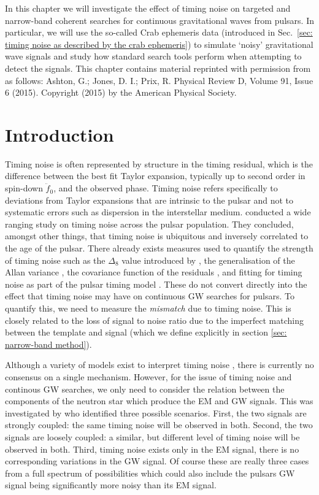 \documentclass[../full_thesis/full_thesis.tex]{subfiles}
\begin{document}
In this chapter we will investigate the effect of timing noise on targeted and
narrow-band coherent searches for continuous gravitational waves from pulsars.
In particular, we will use the so-called Crab ephemeris data (introduced in
Sec.~\ref{sec: timing noise as described by the crab ephemeris}) to simulate
`noisy' gravitational wave signals and study how standard search tools perform
when attempting to detect the signals. This chapter contains material reprinted
with permission from \citet{Ashton2015} as follows: Ashton, G.; Jones, D. I.;
Prix, R. Physical Review D, Volume 91, Issue 6 (2015).  Copyright (2015) by the
American Physical Society.

\section{Introduction}
\label{sec: narrow-band introduction}

Timing noise is
often represented by structure in the timing residual, which is the difference
between the best fit Taylor expansion, typically up to second order in spin-down
$\ddot{f}_0$, and the observed phase. Timing noise refers specifically to
deviations from Taylor expansions that are intrinsic to the pulsar and not to
systematic errors such as dispersion in the interstellar medium.
\citet{Hobbs2010} conducted a wide ranging study on timing noise across the
pulsar population.  They concluded, amongst other things, that timing noise is
ubiquitous and inversely correlated to the age of the pulsar.  There already
exists measures used to quantify the strength of timing noise such as the
$\Delta_{8}$ value introduced by \citet{Arzoumanian1994}, the generalisation
of the Allan variance \citep{Matsakis1997}, the covariance function of the
residuals \citep{Coles2011}, and fitting for timing noise as part of the pulsar
timing model \citep{Lentati2014}. These do not convert directly
into the effect that timing noise may have on continuous GW searches for pulsars. To quantify this, we
need to measure the \emph{mismatch} due to timing noise. This is closely
related to the loss of signal to noise ratio due to the imperfect matching
between the template and signal (which we define explicitly in section
\ref{sec: narrow-band method}).

Although a variety of models exist to interpret timing noise \citep{Lyne2010, Cordes1981}, there is
currently no consensus on a single mechanism. However, for the issue of timing
noise and continous GW searches, we only need to consider the relation between the
components of the neutron star which produce the EM and GW signals.  This was
investigated by \citet{Jones2004} who identified three possible scenarios.
First, the two signals are strongly coupled: the same timing noise will be
observed in both. Second, the two signals are loosely coupled: a similar, but
different level of timing noise will be observed in both. Third, timing noise
exists only in the EM signal, there is no corresponding variations in the GW
signal. Of course these are really three cases from a full spectrum of
possibilities which could also include the pulsars GW signal being significantly more noisy than its EM signal.
\end{document}
